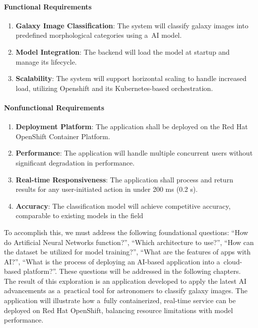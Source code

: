 \paragraph{Functional Requirements}

\begin{enumerate}
    \item \textbf{Galaxy Image Classification}: The system will classify galaxy images into predefined morphological categories using a~AI model.
    \item \textbf{Model Integration}: The backend will load the model at startup and manage its lifecycle.
    \item \textbf{Scalability}: The system will support horizontal scaling to handle increased load, utilizing Openshift and its Kubernetes-based orchestration.
\end{enumerate}

\paragraph{Nonfunctional Requirements}

\begin{enumerate}
    \item \textbf{Deployment Platform}: The application shall be deployed on the Red Hat OpenShift Container Platform.
    \item \textbf{Performance}: The application will handle multiple concurrent users without significant degradation in performance.
    \item \textbf{Real-time Responsiveness}: The application shall process and return results for any user-initiated action in under 200 ms (0.2 s).
    \item \textbf{Accuracy}: The classification model will achieve competitive accuracy, comparable to existing models in the field
\end{enumerate}

To accomplish this, we must address the following foundational questions: \enquote{How do Artificial Neural Networks function?}, \enquote{Which architecture to use?}, \enquote{How can the dataset be utilized for model training?}, \enquote{What are the features of apps with AI?}, \enquote{What is the process of deploying an AI-based application into a~cloud-based platform?}. These questions will be addressed in the following chapters. The result of this exploration is an application developed to apply the latest AI advancements as a~practical tool for astronomers to classify galaxy images. The application will illustrate how a~fully containerized, real-time service can be deployed on Red Hat OpenShift, balancing resource limitations with model performance.

